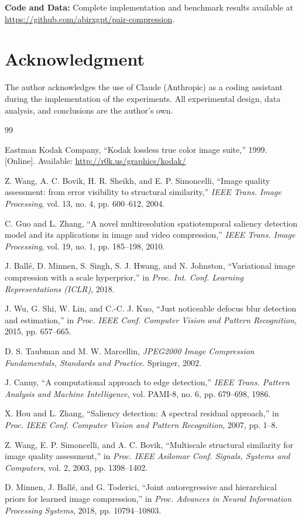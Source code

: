 \documentclass[conference]{IEEEtran}
\begin{document}
\textbf{Code and Data:} Complete implementation and benchmark results
available at \url{https://github.com/abirxgpt/pair-compression}.

\section*{Acknowledgment}
The author acknowledges the use of Claude (Anthropic) as a coding assistant
during the implementation of the experiments. All experimental design,
data analysis, and conclusions are the author's own.

\begin{thebibliography}{99}

Eastman Kodak Company, ``Kodak lossless true color image suite,'' 1999. [Online]. Available: \url{http://r0k.us/graphics/kodak/}

Z. Wang, A. C. Bovik, H. R. Sheikh, and E. P. Simoncelli, ``Image quality assessment: from error visibility to structural similarity,'' \textit{IEEE Trans. Image Processing}, vol. 13, no. 4, pp. 600--612, 2004.

C. Guo and L. Zhang, ``A novel multiresolution spatiotemporal saliency detection model and its applications in image and video compression,'' \textit{IEEE Trans. Image Processing}, vol. 19, no. 1, pp. 185--198, 2010.

J. Ball\'e, D. Minnen, S. Singh, S. J. Hwang, and N. Johnston, ``Variational image compression with a scale hyperprior,'' in \textit{Proc. Int. Conf. Learning Representations (ICLR)}, 2018.

J. Wu, G. Shi, W. Lin, and C.-C. J. Kuo, ``Just noticeable defocus blur detection and estimation,'' in \textit{Proc. IEEE Conf. Computer Vision and Pattern Recognition}, 2015, pp. 657--665.

D. S. Taubman and M. W. Marcellin, \textit{JPEG2000 Image Compression Fundamentals, Standards and Practice}. Springer, 2002.

J. Canny, ``A computational approach to edge detection,'' \textit{IEEE Trans. Pattern Analysis and Machine Intelligence}, vol. PAMI-8, no. 6, pp. 679--698, 1986.

X. Hou and L. Zhang, ``Saliency detection: A spectral residual approach,'' in \textit{Proc. IEEE Conf. Computer Vision and Pattern Recognition}, 2007, pp. 1--8.

Z. Wang, E. P. Simoncelli, and A. C. Bovik, ``Multiscale structural similarity for image quality assessment,'' in \textit{Proc. IEEE Asilomar Conf. Signals, Systems and Computers}, vol. 2, 2003, pp. 1398--1402.

D. Minnen, J. Ball\'e, and G. Toderici, ``Joint autoregressive and hierarchical priors for learned image compression,'' in \textit{Proc. Advances in Neural Information Processing Systems}, 2018, pp. 10794--10803.

\end{thebibliography}
\end{document}
